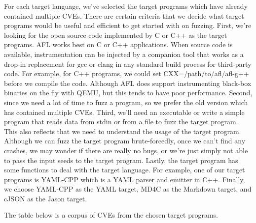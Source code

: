 \documentclass[12pt]{diazessay}
\begin{document}
For each target language, we’ve selected the target programs which have already contained multiple CVEs. There are certain criteria that we decide what target programs would be useful and efficient to get started with on fuzzing.  
First, we’re looking for the open source code implemented by C or C++ as the target programs.  AFL works best on C or C++ applications. When source code is available, instrumentation can be injected by a companion tool that works as a drop-in replacement for gcc or clang in any standard build process for third-party code. For example, for C++ programs, we could set CXX=/path/to/afl/afl-g++ before we compile the code. Although AFL does support instrumenting black-box binaries on the fly with QEMU, but this tends to have poor performance. 
Second, since we need a lot of time to fuzz a program, so we prefer the old version which has contained multiple CVEs. 
Third, we’ll need an executable or write a simple program that reads data from stdin or from a file to fuzz the target program.  This also reflects that we need to understand the usage of the target program. Although we can fuzz the target program brute-forcedly, once we can’t find any crashes, we may wonder if there are really no bugs, or we’re just simply not able to pass the input seeds to the target program. 
Lastly, the target program has some functions to deal with the target language. For example, one of our target programs is YAML-CPP\cite{YAML-CPP} which is a YAML parser and emitter in C++. Finally, we choose YAML-CPP as the YAML target, MD4C\cite{MD4C} as the Markdown target, and cJSON\cite{cJSON} as the Jason target.  

The table below is a corpus of CVEs from the chosen target programs.
\end{document}

